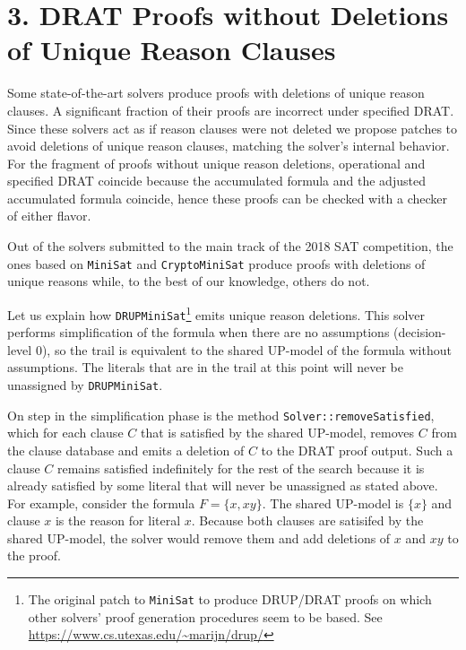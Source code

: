 \documentclass[
]{report}
\begin{document}
\hypertarget{drat-proofs-without-deletions-of-unique-reason-clauses}{%
\chapter{3. DRAT Proofs without Deletions of Unique Reason
Clauses}\label{drat-proofs-without-deletions-of-unique-reason-clauses}}

Some state-of-the-art solvers produce proofs with deletions of unique
reason clauses. A significant fraction of their proofs are incorrect
under specified DRAT. Since these solvers act as if reason clauses were
not deleted we propose patches to avoid deletions of unique reason
clauses, matching the solver's internal behavior. For the fragment of
proofs without unique reason deletions, operational and specified DRAT
coincide because the accumulated formula and the adjusted accumulated
formula coincide, hence these proofs can be checked with a checker of
either flavor.

Out of the solvers submitted to the main track of the 2018 SAT
competition, the ones based on \texttt{MiniSat} and
\texttt{CryptoMiniSat} produce proofs with deletions of unique reasons
while, to the best of our knowledge, others do not.

Let us explain how \texttt{DRUPMiniSat}\footnote{The original patch to
  \texttt{MiniSat} to produce DRUP/DRAT proofs on which other solvers'
  proof generation procedures seem to be based. See
  \url{https://www.cs.utexas.edu/~marijn/drup/}} emits unique reason
deletions. This solver performs simplification of the formula when there
are no assumptions (decision-level 0), so the trail is equivalent to the
shared UP-model of the formula without assumptions. The literals that
are in the trail at this point will never be unassigned by
\texttt{DRUPMiniSat}.

On step in the simplification phase is the method
\texttt{Solver::removeSatisfied}, which for each clause \(C\) that is
satisfied by the shared UP-model, removes \(C\) from the clause database
and emits a deletion of \(C\) to the DRAT proof output. Such a clause
\(C\) remains satisfied indefinitely for the rest of the search because
it is already satisfied by some literal that will never be unassigned as
stated above. For example, consider the formula \(F = \{x, xy\}\). The
shared UP-model is \(\{x\}\) and clause \(x\) is the reason for literal
\(x\). Because both clauses are satisifed by the shared UP-model, the
solver would remove them and add deletions of \(x\) and \(xy\) to the
proof.
\end{document}
